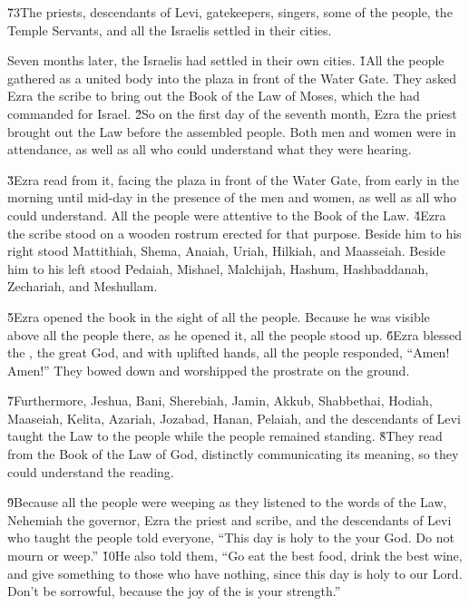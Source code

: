 \v{73}The priests, descendants of Levi, gatekeepers, singers, some of the people, the Temple Servants, and all the Israelis settled in their cities.

Seven months later, the Israelis had settled in their own cities.
\v{1}All the people gathered as a united body into the plaza in front of the Water Gate. They asked Ezra the scribe to bring out the Book of the Law of Moses, which the  had commanded for Israel. \v{2}So on the first day of the seventh month, Ezra the priest brought out the Law before the assembled people. Both men and women were in attendance, as well as all who could understand what they were hearing.

\v{3}Ezra read from it, facing the plaza in front of the Water Gate, from early in the morning until mid-day in the presence of the men and women, as well as all who could understand. All the people were attentive to the Book of the Law. \v{4}Ezra the scribe stood on a wooden rostrum erected for that purpose. Beside him to his right stood Mattithiah, Shema, Anaiah, Uriah, Hilkiah, and Maasseiah. Beside him to his left stood Pedaiah, Mishael, Malchijah, Hashum, Hashbaddanah, Zechariah, and Meshullam.

\v{5}Ezra opened the book in the sight of all the people. Because he was visible above all the people there, as he opened it, all the people stood up. \v{6}Ezra blessed the , the great God, and with uplifted hands, all the people responded, ``Amen! Amen!'' They bowed down and worshipped the  prostrate on the ground.

\v{7}Furthermore, Jeshua, Bani, Sherebiah, Jamin, Akkub, Shabbethai, Hodiah, Maaseiah, Kelita, Azariah, Jozabad, Hanan, Pelaiah, and the descendants of Levi taught the Law to the people while the people remained standing. \v{8}They read from the Book of the Law of God, distinctly communicating its meaning, so they could understand the reading.

\v{9}Because all the people were weeping as they listened to the words of the Law, Nehemiah the governor, Ezra the priest and scribe, and the descendants of Levi who taught the people told everyone, ``This day is holy to the  your God. Do not mourn or weep.'' \v{10}He also told them, ``Go eat the best food, drink the best wine, and give something to those who have nothing, since this day is holy to our Lord. Don't be sorrowful, because the joy of the  is your strength.''

